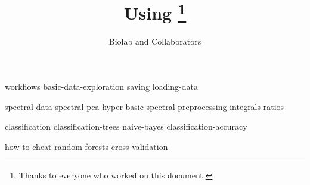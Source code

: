 \documentclass[symmetric, justified, a4paper]{tufte-book}
\title{Using \mutation\thanks{Thanks to everyone who worked on this document.}}
\author[Biolab and Collaborators]{Biolab and Collaborators}
\begin{document}
\frontmatter

\maketitle



\tableofcontents

%

\mainmatter



{workflows}
{basic-data-exploration}
{saving}
{loading-data}

{spectral-data}
{spectral-pca}
{hyper-basic}
{spectral-preprocessing}
{integrals-ratios}

{classification}
{classification-trees}
{naive-bayes}
{classification-accuracy}

{how-to-cheat}
{random-forests}
{cross-validation}






\backmatter





\printindex
\end{document}
